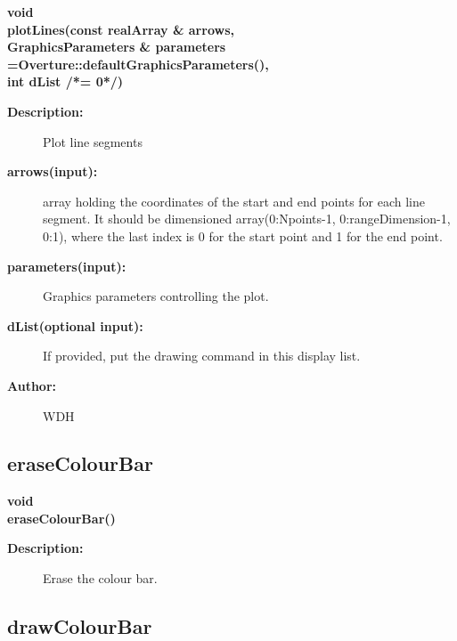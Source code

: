 \begin{flushleft} \textbf{%
void  \\ 
\settowidth{\GLGraphicsInterfaceIncludeArgIndent}{plotLines(}%
plotLines(const realArray \& arrows, \\ 
GraphicsParameters \& parameters  =Overture::defaultGraphicsParameters(),\\ 
\hspace{\GLGraphicsInterfaceIncludeArgIndent}int dList /*= 0*/)
}\end{flushleft}
\begin{description}
\item[{\bf Description:}] 
   Plot line segments
\item[{\bf arrows(input):}]  array holding the coordinates of the start and end points for each line segment. 
 It should be dimensioned array(0:Npoints-1, 0:rangeDimension-1, 0:1), where the last index is
 0 for the start point and 1 for the end point.
\item[{\bf parameters(input):}]  Graphics parameters controlling the plot.
\item[{\bf dList(optional input):}]  If provided, put the drawing command in this display list.

\item[{\bf Author:}]  WDH
\end{description}
\subsection{eraseColourBar}
 
\begin{flushleft} \textbf{%
void   \\ 
\settowidth{\GLGraphicsInterfaceIncludeArgIndent}{eraseColourBar(}%
eraseColourBar()
}\end{flushleft}
\begin{description}
\item[{\bf Description:}] 
       Erase the colour bar.
\end{description}
\subsection{drawColourBar}
 
